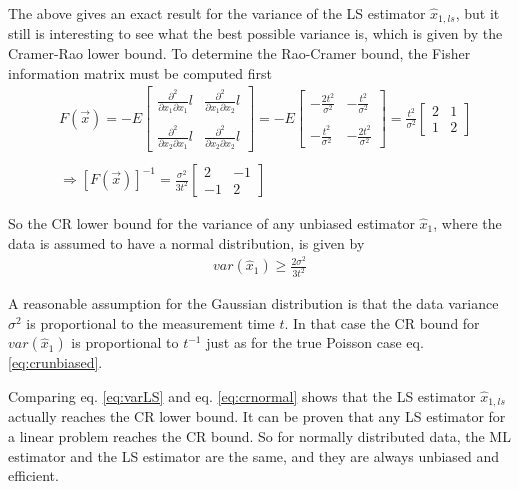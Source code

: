 \documentclass[report,12pt]{report}
\begin{document}
The above gives an exact result for the variance of the LS estimator $\hat x_{1, ls}$, but it still is interesting to see what the best possible variance is, which is given by the Cramer-Rao lower bound. To determine the Rao-Cramer bound, the Fisher information matrix must be computed first
\begin{align}
	&F(\vec x)
	= -E\left[ \begin{array}{cc} 
		\frac{\partial^2}{\partial x_1 \partial x_1} l
		&
		\frac{\partial^2}{\partial x_1 \partial x_2} l
		\\
		\\
		\frac{\partial^2}{\partial x_2 \partial x_1} l
		&
		\frac{\partial^2}{\partial x_2 \partial x_2} l
	\end{array} \right]
	= -E \left[ \begin{array}{cc} 
		-\frac{2t^2}{\sigma^2}
		&
		-\frac{t^2}{\sigma^2}
		\\
		\\
		-\frac{t^2}{\sigma^2}
		&
		-\frac{2t^2}{\sigma^2}
		\end{array} \right]
		= \frac{t^2}{\sigma^2}\left[ \begin{array}{cc} 
		2 & 1\\
		1 & 2
	\end{array} \right]
	\nonumber\\
	\nonumber\\
	&\Rightarrow [F(\vec x)]^{-1} 
	= \frac{\sigma^2}{3t^2} 
	\left[\begin{array}{cc}
		2 & -1\\
		-1 & 2
	\end{array}\right]
\end{align}

So the CR lower bound for the variance of any unbiased estimator $\hat x_1$, where the data is assumed to have a normal distribution, is given by
\begin{align}
	var(\hat x_1) \geq \frac{2 \sigma^2}{3t^2}
	\label{eq:crnormal}
\end{align}

A reasonable assumption for the Gaussian distribution is that the data variance $\sigma^2$ is proportional to the measurement time $t$. In that case the CR bound for $var(\hat x_{1})$ is proportional to $t^{-1}$ just as for the true Poisson case eq. \ref{eq:crunbiased}.

Comparing eq. \ref{eq:varLS} and eq. \ref{eq:crnormal} shows that the LS estimator $\hat x_{1,ls}$ actually reaches the CR lower bound. It can be proven that any LS estimator for a linear problem reaches the CR bound. So for normally distributed data, the ML estimator and the LS estimator are the same, and they are always unbiased and efficient.\\
\end{document}
